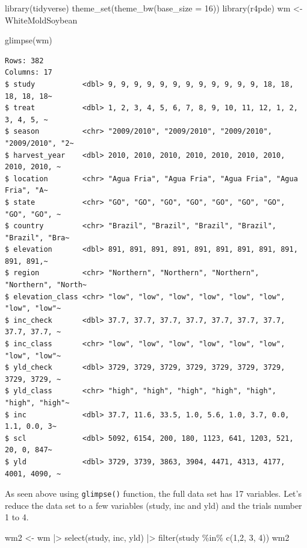 \documentclass[
  letterpaper,
  DIV=11,
  numbers=noendperiod]{scrreprt}
\newenvironment{Shaded}{\begin{snugshade}}{\end{snugshade}}
\newcommand{\AttributeTok}[1]{\textcolor[rgb]{0.40,0.45,0.13}{#1}}
\newcommand{\DecValTok}[1]{\textcolor[rgb]{0.68,0.00,0.00}{#1}}
\newcommand{\FunctionTok}[1]{\textcolor[rgb]{0.28,0.35,0.67}{#1}}
\newcommand{\NormalTok}[1]{\textcolor[rgb]{0.00,0.23,0.31}{#1}}
\newcommand{\OtherTok}[1]{\textcolor[rgb]{0.00,0.23,0.31}{#1}}
\newcommand{\SpecialCharTok}[1]{\textcolor[rgb]{0.37,0.37,0.37}{#1}}
\begin{document}
\begin{Shaded}
\begin{Highlighting}[]
\FunctionTok{library}\NormalTok{(tidyverse)}
\FunctionTok{theme\_set}\NormalTok{(}\FunctionTok{theme\_bw}\NormalTok{(}\AttributeTok{base\_size =} \DecValTok{16}\NormalTok{))}
\FunctionTok{library}\NormalTok{(r4pde)}
\NormalTok{wm }\OtherTok{\textless{}{-}}\NormalTok{ WhiteMoldSoybean}

\FunctionTok{glimpse}\NormalTok{(wm)}
\end{Highlighting}
\end{Shaded}

\begin{verbatim}
Rows: 382
Columns: 17
$ study           <dbl> 9, 9, 9, 9, 9, 9, 9, 9, 9, 9, 9, 9, 18, 18, 18, 18, 18~
$ treat           <dbl> 1, 2, 3, 4, 5, 6, 7, 8, 9, 10, 11, 12, 1, 2, 3, 4, 5, ~
$ season          <chr> "2009/2010", "2009/2010", "2009/2010", "2009/2010", "2~
$ harvest_year    <dbl> 2010, 2010, 2010, 2010, 2010, 2010, 2010, 2010, 2010, ~
$ location        <chr> "Agua Fria", "Agua Fria", "Agua Fria", "Agua Fria", "A~
$ state           <chr> "GO", "GO", "GO", "GO", "GO", "GO", "GO", "GO", "GO", ~
$ country         <chr> "Brazil", "Brazil", "Brazil", "Brazil", "Brazil", "Bra~
$ elevation       <dbl> 891, 891, 891, 891, 891, 891, 891, 891, 891, 891, 891,~
$ region          <chr> "Northern", "Northern", "Northern", "Northern", "North~
$ elevation_class <chr> "low", "low", "low", "low", "low", "low", "low", "low"~
$ inc_check       <dbl> 37.7, 37.7, 37.7, 37.7, 37.7, 37.7, 37.7, 37.7, 37.7, ~
$ inc_class       <chr> "low", "low", "low", "low", "low", "low", "low", "low"~
$ yld_check       <dbl> 3729, 3729, 3729, 3729, 3729, 3729, 3729, 3729, 3729, ~
$ yld_class       <chr> "high", "high", "high", "high", "high", "high", "high"~
$ inc             <dbl> 37.7, 11.6, 33.5, 1.0, 5.6, 1.0, 3.7, 0.0, 1.1, 0.0, 3~
$ scl             <dbl> 5092, 6154, 200, 180, 1123, 641, 1203, 521, 20, 0, 847~
$ yld             <dbl> 3729, 3739, 3863, 3904, 4471, 4313, 4177, 4001, 4090, ~
\end{verbatim}

As seen above using \texttt{glimpse()} function, the full data set has
17 variables. Let's reduce the data set to a few variables (study, inc
and yld) and the trials number 1 to 4.

\begin{Shaded}
\begin{Highlighting}[]
\NormalTok{wm2 }\OtherTok{\textless{}{-}}\NormalTok{ wm }\SpecialCharTok{|\textgreater{}} 
  \FunctionTok{select}\NormalTok{(study, inc, yld) }\SpecialCharTok{|\textgreater{}} 
  \FunctionTok{filter}\NormalTok{(study }\SpecialCharTok{\%in\%} \FunctionTok{c}\NormalTok{(}\DecValTok{1}\NormalTok{,}\DecValTok{2}\NormalTok{, }\DecValTok{3}\NormalTok{, }\DecValTok{4}\NormalTok{)) }
\NormalTok{wm2}
\end{Highlighting}
\end{Shaded}
\end{document}
